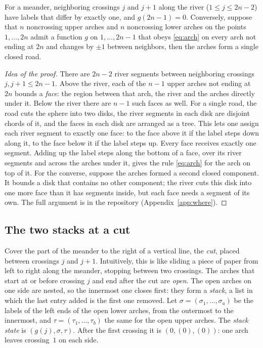 \begin{lemma}[labels]\label{lem:labels}
For a meander, neighboring crossings $j$ and $j+1$ along the river ($1\le j\le 2n-2$) have labels that differ by
exactly one, and $g(2n-1)=0$. Conversely, suppose that $n$ noncrossing upper arches and $n$ noncrossing lower arches
on the points $1,\ldots,2n$ admit a function $g$ on
$1,\ldots,2n-1$ that obeys \eqref{eq:arch} on every arch not ending at $2n$ and changes by $\pm1$ between neighbors,
then the arches form a single closed road.
\end{lemma}

\begin{proof}[Idea of the proof]
There are $2n-2$ river segments between neighboring crossings $j,j+1\le 2n-1$. Above the river, each of the $n-1$
upper arches not ending at $2n$ bounds a \emph{face}: the region between that arch, the river and the arches directly
under it. Below the river there are $n-1$ such faces as well. For a single road, the road cuts the sphere into two
disks, the river segments in each disk are disjoint chords of it, and the faces in each disk are arranged as a tree.
This lets one assign each river segment to exactly one face: to the face above it if the label steps down along it, to
the face below it if the label steps up. Every face receives exactly one segment. Adding up the label steps along the
bottom of a face, over its river segments and across the arches under it, gives the rule \eqref{eq:arch} for the arch
on top of it. For the converse,
suppose the arches formed a second closed component. It bounds a disk that contains no other component; the river
cuts this disk into one more face than it has segments inside, but each face needs a segment of its own. The full
argument is in the repository (Appendix~\ref{app:where}).
\end{proof}

\subsection{The two stacks at a cut}

Cover the part of the meander to the right of a vertical line, the \emph{cut}, placed between crossings $j$ and $j+1$.
Intuitively, this is like sliding a piece of paper from left to right along the meander, stopping between two
crossings. The arches that start at or before crossing $j$ and end after the cut are \emph{open}. The open arches on
one side are nested, so the innermost one closes first: they form a \emph{stack}, a list in which the last entry added
is the first one removed. Let
$\sigma=(\sigma_1,\ldots,\sigma_a)$ be the labels of the left ends of the open lower arches, from the outermost to
the innermost, and $\tau=(\tau_1,\ldots,\tau_b)$ the same for the open upper arches. The \emph{stack state} is
$(g(j),\sigma,\tau)$. After the first crossing it is $(0,(0),(0))$: one arch leaves crossing~$1$ on each side.


